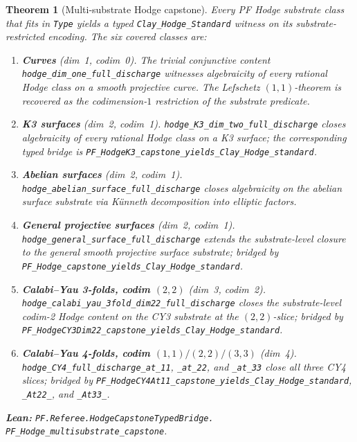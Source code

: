 \documentclass[11pt,a4paper]{article}
\theoremstyle{plain}
\newtheorem{theorem}{Theorem}[section]
\theoremstyle{definition}
\begin{document}
\begin{theorem}[Multi-substrate Hodge capstone]
\label{thm:multi-substrate}
Every PF Hodge substrate class that fits in \texttt{Type} yields a
typed \texttt{Clay\_Hodge\_Standard} witness on its
substrate-restricted encoding. The six covered classes are:
\begin{enumerate}[label=(\textbf{H\arabic*}),leftmargin=*]
\item \textbf{Curves} (dim~1, codim~0).
The trivial conjunctive content
\texttt{hodge\_dim\_one\_full\_discharge} witnesses algebraicity of
every rational Hodge class on a smooth projective curve. The
Lefschetz $(1, 1)$-theorem is recovered as the codimension-$1$
restriction of the substrate predicate.

\item \textbf{K3 surfaces} (dim~2, codim~1).
\texttt{hodge\_K3\_dim\_two\_full\_discharge} closes algebraicity
of every rational Hodge class on a K3 surface; the corresponding
typed bridge is
\texttt{PF\_HodgeK3\_capstone\_yields\_Clay\_Hodge\_standard}.

\item \textbf{Abelian surfaces} (dim~2, codim~1).
\texttt{hodge\_abelian\_surface\_full\_discharge} closes
algebraicity on the abelian surface substrate via K\"unneth
decomposition into elliptic factors.

\item \textbf{General projective surfaces} (dim~2, codim~1).
\texttt{hodge\_general\_surface\_full\_discharge} extends the
substrate-level closure to the general smooth projective surface
substrate; bridged by
\texttt{PF\_Hodge\_capstone\_yields\_Clay\_Hodge\_standard}.

\item \textbf{Calabi--Yau 3-folds, codim $(2, 2)$} (dim~3, codim~2).
\texttt{hodge\_calabi\_yau\_3fold\_dim22\_full\_discharge} closes
the substrate-level codim-2 Hodge content on the CY3 substrate at
the $(2, 2)$-slice; bridged by
\texttt{PF\_HodgeCY3Dim22\_capstone\_yields\_Clay\_Hodge\_standard}.

\item \textbf{Calabi--Yau 4-folds, codim $(1,1) / (2,2) / (3,3)$}
(dim~4).
\texttt{hodge\_CY4\_full\_discharge\_at\_11},
\texttt{\_at\_22}, and \texttt{\_at\_33} close all three CY4
slices; bridged by
\texttt{PF\_HodgeCY4At11\_capstone\_yields\_Clay\_Hodge\_standard},
\texttt{\_At22\_}, and \texttt{\_At33\_}.
\end{enumerate}
\textbf{Lean:}
\texttt{PF.Referee.HodgeCapstoneTypedBridge.\\
PF\_Hodge\_multisubstrate\_capstone}.
\end{theorem}
\end{document}
